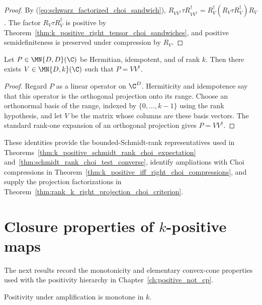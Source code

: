 \begin{proof}
    \leanok
    By (\ref{eq:schwarz_factorized_choi_sandwich}),
    $R_{VV^\dagger}\tau R_{VV^\dagger}^\dagger
        =R_V^\dagger(R_V\tau R_V^\dagger)R_V$.
    The factor $R_V\tau R_V^\dagger$ is positive by
    Theorem~\ref{thm:k_positive_right_tensor_choi_sandwiches}, and positive
    semidefiniteness is preserved under compression by $R_V$.
\end{proof}

\begin{lemma}
    \label{lem:rank_k_hermitian_projection_factorization}
    \leanok
    Let $P\in\MN{D,D}(\C)$ be Hermitian, idempotent, and of rank $k$.
    Then there exists $V\in\MN{D,k}(\C)$ such that $P=VV^\dagger$.
\end{lemma}

\begin{proof}
    \leanok
    Regard $P$ as a linear operator on $\C^D$. Hermiticity and idempotence say
    that this operator is the orthogonal projection onto its range. Choose an
    orthonormal basis of the range, indexed by $\{0,\ldots,k-1\}$ using the
    rank hypothesis, and let $V$ be the matrix whose columns are these basis
    vectors. The standard rank-one expansion of an orthogonal projection gives
    $P=VV^\dagger$.
\end{proof}

These identities provide the bounded-Schmidt-rank representatives used in
Theorems~\ref{thm:k_positive_schmidt_rank_choi_expectation}
and~\ref{thm:schmidt_rank_choi_test_converse}, identify ampliations with Choi
compressions in Theorem~\ref{thm:k_positive_iff_right_choi_compressions}, and
supply the projection factorizations in
Theorem~\ref{thm:rank_k_right_projection_choi_criterion}.

\section{Closure properties of $k$-positive maps}
\label{sec:app_positive_not_cp_k_positive_closure}

The next results record the monotonicity and elementary convex-cone properties
used with the positivity hierarchy in Chapter~\ref{ch:positive_not_cp}.

\begin{theorem}
    \label{thm:k_positive_mono_succ}
    \leanok
    Positivity under amplification is monotone in $k$.
\end{theorem}

